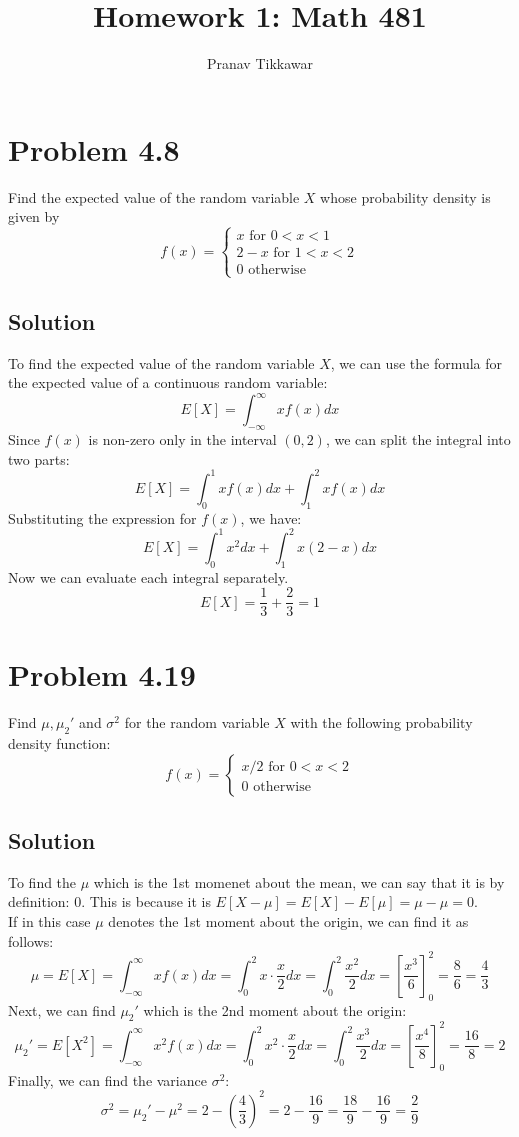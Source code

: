 \documentclass{article}
\author{Pranav Tikkawar}
\title{Homework 1: Math 481}
\begin{document}
\maketitle
\section*{Problem 4.8}
Find the expected value of the random variable $X$ whose probability density is given by 
$$ f(x) = \begin{cases}
    x \text{ for } 0 < x < 1 \\
    2 - x \text{ for } 1 < x < 2 \\
    0 \text{ otherwise}
\end{cases} $$
\subsection*{Solution}
To find the expected value of the random variable $X$, we can use the formula for the expected value of a continuous random variable:
$$
E[X] = \int_{-\infty}^{\infty} x f(x) dx
$$
Since $f(x)$ is non-zero only in the interval $(0, 2)$, we can split the integral into two parts:
$$
E[X] = \int_{0}^{1} x f(x) dx + \int_{1}^{2} x f(x) dx
$$
Substituting the expression for $f(x)$, we have:
$$
E[X] = \int_{0}^{1} x^2 dx + \int_{1}^{2} x(2 - x) dx
$$
Now we can evaluate each integral separately.
$$ E[X] = \frac{1}{3} + \frac{2}{3}  = 1$$

\section*{Problem 4.19}
Find $\mu, \mu_2'$ and $\sigma^2$ for the random variable $X$ with the following probability density function:
$$ f(x) = \begin{cases}
    x/2 \text{ for } 0 < x < 2 \\
    0 \text{ otherwise}
\end{cases} $$
\subsection*{Solution}
To find the $\mu$ which is the 1st momenet about the mean, we can say that it is by definition: 0. This is because it is $E[X - \mu] = E[X]-E[\mu] = \mu - \mu= 0$.\\
If in this case $\mu$ denotes the 1st moment about the origin, we can find it as follows:
$$
\mu = E[X] = \int_{-\infty}^{\infty} x f(x) dx = \int_{0}^{2} x \cdot \frac{x}{2} dx = \int_{0}^{2} \frac{x^2}{2} dx = \left[ \frac{x^3}{6} \right]_{0}^{2} = \frac{8}{6} = \frac{4}{3}
$$
Next, we can find $\mu_2'$ which is the 2nd moment about the origin:
$$
\mu_2' = E[X^2] = \int_{-\infty}^{\infty} x^2 f(x) dx = \int_{0}^{2} x^2 \cdot \frac{x}{2} dx = \int_{0}^{2} \frac{x^3}{2} dx = \left[ \frac{x^4}{8} \right]_{0}^{2} = \frac{16}{8} = 2
$$
Finally, we can find the variance $\sigma^2$:
$$
\sigma^2 = \mu_2' - \mu^2 = 2 - \left( \frac{4}{3} \right)^2 = 2 - \frac{16}{9} = \frac{18}{9} - \frac{16}{9} = \frac{2}{9}
$$
\end{document}
